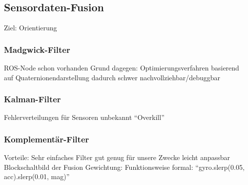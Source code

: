
\subsection{Sensordaten-Fusion}

Ziel: Orientierung


\subsubsection{Madgwick-Filter}

ROS-Node schon vorhanden
Grund dagegen: Optimierungsverfahren basierend auf Quaternionendarstellung dadurch schwer nachvollziehbar/debuggbar



\subsubsection{Kalman-Filter}

Fehlerverteilungen für Sensoren unbekannt
“Overkill”


\subsubsection{Komplementär-Filter}


Vorteile:
Sehr einfaches Filter
gut genug für unsere Zwecke
leicht anpassbar
Blockschaltbild der Fusion
Gewichtung: Funktionsweise formal: “gyro.slerp(0.05, acc).slerp(0.01, mag)”



